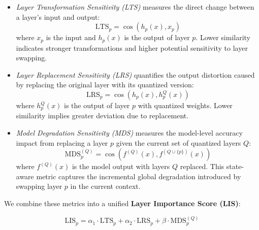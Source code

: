 \documentclass{article}
\begin{document}
\begin{itemize}[leftmargin=*]
    \item \textit{Layer Transformation Sensitivity (LTS)} measures the direct change between a layer’s input and output: \vspace{-5pt}
    \begin{equation}
    \text{LTS}_p = \cos\left(h_p(x), x_p\right)
    \label{eq:IOA}
    \end{equation}
    where \( x_p \) is the input and \( h_p(x) \) is the output of layer \( p \). Lower similarity indicates stronger transformations and higher potential sensitivity to layer swapping.

    \item \textit{Layer Replacement Sensitivity (LRS)} quantifies the output distortion caused by replacing the original layer with its quantized version:\vspace{-5pt}
    \begin{equation}
    \text{LRS}_p = \cos\left(h_p(x), h_p^Q(x)\right)
    \label{eq:MES}
    \end{equation}
    where \( h_p^Q(x) \) is the output of layer \( p \) with quantized weights. Lower similarity implies greater deviation due to replacement. 

    \item \textit{Model Degradation Sensitivity (MDS)} measures the model-level accuracy impact from replacing a layer \( p \) given the current set of quantized layers \( Q \):\vspace{-5pt}
    \begin{equation}
    \text{MDS}_p^{(Q)} = \cos\left(f^{(Q)}(x), f^{(Q \cup \{p\})}(x)\right)
    \label{eq:TLI}
    \end{equation}
    where \( f^{(Q)}(x) \) is the model output with layers \( Q \) replaced. This state-aware metric captures the incremental global degradation introduced by swapping layer \( p \) in the current context. \vspace{-5pt}
\end{itemize}

We combine these metrics into a unified \textbf{Layer Importance Score (LIS)}: 

\begin{equation}
\text{LIS}_p = \alpha_1 \cdot \text{LTS}_p + \alpha_2 \cdot \text{LRS}_p + \beta \cdot \text{MDS}_p^{(Q)}
\label{eq:LIS}
\end{equation}
\end{document}
